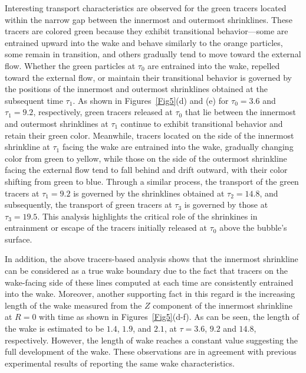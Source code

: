 \documentclass[aps,prfluids,reprint,nofootinbib,onecolumn,groupedaddress,showkeys]{revtex4-2}
\begin{document}
	Interesting transport characteristics are observed for the green tracers located within the narrow gap between the innermost and outermost shrinklines. These tracers are colored green because they exhibit transitional behavior—some are entrained upward into the wake and behave similarly to the orange particles, some remain in transition, and others gradually tend to move toward the external flow. Whether the green particles at $\tau_0$ are entrained into the wake, repelled toward the external flow, or maintain their transitional behavior is governed by the positions of the innermost and outermost shrinklines obtained at the subsequent time $\tau_1$. As shown in Figures~\ref{Fig5}(d) and (e) for $\tau_0 = 3.6$ and $\tau_1 = 9.2$, respectively, green tracers released at $\tau_0$ that lie between the innermost and outermost shrinklines at $\tau_1$ continue to exhibit transitional behavior and retain their green color. Meanwhile, tracers located on the side of the innermost shrinkline at $\tau_1$ facing the wake are entrained into the wake, gradually changing color from green to yellow, while those on the side of the outermost shrinkline facing the external flow tend to fall behind and drift outward, with their color shifting from green to blue. Through a similar process, the transport of the green tracers at $\tau_1 = 9.2$ is governed by the shrinklines obtained at $\tau_2 = 14.8$, and subsequently, the transport of green tracers at $\tau_3$ is governed by those at $\tau_3 = 19.5$. This analysis highlights the critical role of the shrinkines in entrainment or escape of the tracers initially released at $\tau_0$ above the bubble's surface.
	
	In addition, the above tracers-based analysis shows that the innermost shrinkline can be considered as a true wake boundary due to the fact that tracers on the wake-facing side of these lines computed at each time are consistently entrained into the wake. Moreover, another supporting fact in this regard is the increasing length of the wake measured from the $Z$ component of the innermost shrinkline at $R = 0$ with time as shown in Figures~\ref{Fig5}(d-f). As can be seen, the length of the wake {\color{black}is} estimated to be $1.4$, $1.9$, and $2.1$, at $\tau=3.6$, $9.2$ and $14.8$, respectively. However, the {\color{black}length} of wake reaches a constant value suggesting the full development of the wake. These {\color{black}observations} are in agreement with previous experimental results of \citet{fan1986} reporting the same wake characteristics. 
	
\end{document}
